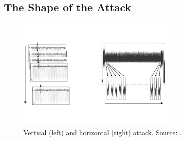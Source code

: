 \subsection{The Shape of the Attack}\label{sec:form}
\begin{figure}
\centering
\includegraphics[width=0.7\textwidth]{../Figures/horizontal_vertical.pdf} 
\caption[Vertical and horizontal attacks.]{Vertical (left) and horizontal (right) attack. Source: \cite{clavier2010horizontal}.}\label{fig:vert_hor}
\end{figure}

